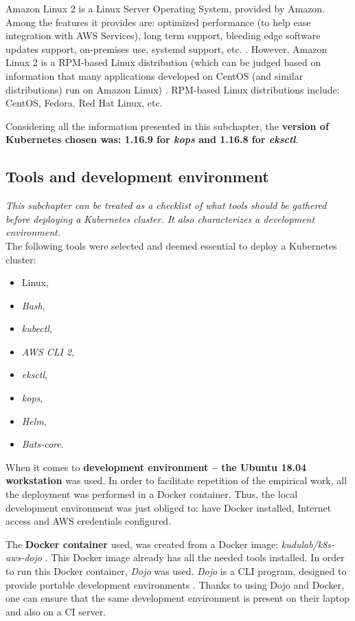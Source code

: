 Amazon Linux 2 is a Linux Server Operating System, provided by Amazon. Among the features it provides are: optimized performance (to help ease integration with AWS Services), long term support, bleeding edge software updates support, on-premises use, systemd support, etc. \cite{al2}. However, Amazon Linux 2 is a RPM-based Linux distribution (which can be judged based on information that many applications developed on CentOS (and similar distributions) run on Amazon Linux) \cite{al2-centos}. RPM-based Linux distributions include: CentOS, Fedora, Red Hat Linux, etc.

Considering all the information presented in this subchapter, the \textbf{version of Kubernetes chosen was: 1.16.9 for \textit{kops} and 1.16.8 for \textit{eksctl}}.


\subsection{Tools and development environment}
\label{tools}
\textit{This subchapter can be treated as a checklist of what tools should be gathered before deploying a Kubernetes cluster. It also characterizes a development environment.}
\\

The following tools were selected and deemed essential to deploy a Kubernetes cluster:
\begin{itemize}
\item Linux,
\item \textit{Bash},
\item \textit{kubectl},
\item \textit{AWS CLI 2},
\item \textit{eksctl},
\item \textit{kops},
\item \textit{Helm},
\item \textit{Bats-core}.
\end{itemize}

When it comes to \textbf{development environment -- the Ubuntu 18.04 workstation} was used. In order to facilitate repetition of the empirical work, all the deployment was performed in a Docker container. Thus, the local development environment was just obliged to: have Docker installed, Internet access and AWS credentials configured.

The \textbf{Docker container} used, was created from a Docker image: \textit{kudulab/k8s-aws-dojo} \cite{gh-k8s-aws-dojo}. This Docker image already has all the needed tools installed. In order to run this Docker container, \textit{Dojo} was used. \textit{Dojo} is a CLI program, designed to provide portable development environments \cite{gh-dojo}. Thanks to using Dojo and Docker, one can ensure that the same development environment is present on their laptop and also on a CI server.

